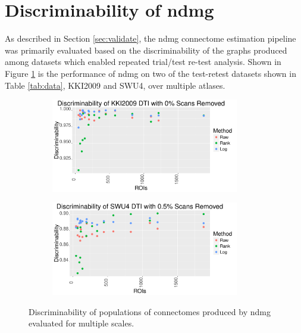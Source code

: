 \section{Discriminability of ndmg}
\label{sec:resultdesc}
As described in Section \ref{sec:validate}, the ndmg connectome estimation pipeline was primarily evaluated based on the discriminability of the graphs produced among datasets which enabled repeated trial/test re-test analysis. Shown in Figure \ref{fig:descr} is the performance of ndmg on two of the test-retest datasets shown in Table \ref{tab:data}, KKI2009 and SWU4, over multiple atlases.
\begin{figure}[h!]
\centering
\begin{subfigure}[h!]{0.9\textwidth}
\centering
\includegraphics[width=0.9\textwidth]{./stats/kki2009_disc.pdf}
\end{subfigure}
\begin{subfigure}[h!]{0.9\textwidth}
\centering
\includegraphics[width=0.9\textwidth]{./stats/swu4_disc.pdf}
\end{subfigure}
\makeatletter
\let\@currsize\normalsize
\caption{Discriminability of populations of connectomes produced by ndmg evaluated for multiple scales.}
\label{fig:descr}
\end{figure}
